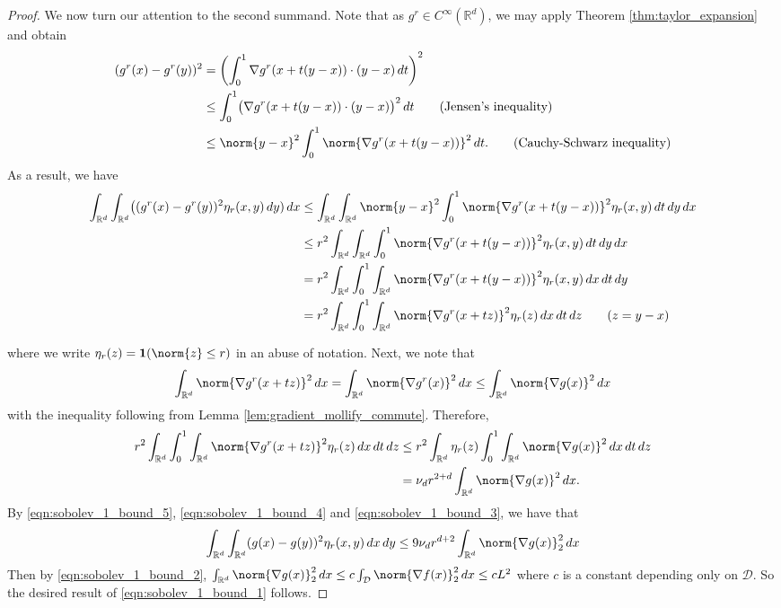 \documentclass{article}
\newcommand{\Reals}{\mathbb{R}}
\newcommand{\1}{\mathbf{1}}
\newcommand{\D}{\mathcal{D}}
\newcommand{\Rd}{\Reals^d}
\theoremstyle{alden}
\theoremstyle{aldenthm}
\theoremstyle{definition}
\theoremstyle{remark}
\begin{document}
\begin{proof}
	We now turn our attention to the second summand. Note that as $g^r \in C^{\infty}(\Rd)$, we may apply Theorem \ref{thm:taylor_expansion} and obtain
	\begin{align*}
	(g^r(x) - g^r(y))^2 & = \left(\int_{0}^{1} \nabla g^r(x + t(y - x)) \cdot (y - x) \,dt\right)^2 \\
	& \leq \int_{0}^{1} \bigl(\nabla g^r(x + t(y - x)) \cdot (y - x)\bigr)^2 \,dt  \tag{Jensen's inequality} \\
	& \leq \norm{y - x}^2 \int_{0}^{1} \norm{\nabla g^r(x + t(y - x))}^2 \,dt. \tag{Cauchy-Schwarz inequality}
	\end{align*}
	As a result, we have
	\begin{align*}
	\int_{\Rd} \int_{\Rd} \bigl((g^r(x) - g^r(y))^2 \eta_r(x,y) \,dy) \,dx & \leq \int_{\Rd} \int_{\Rd} \norm{y - x}^2  \int_{0}^{1} \norm{\nabla g^r(x + t(y - x))}^2 \eta_r(x,y) \,dt \,dy \,dx \\
	& \leq r^{2} \int_{\Rd} \int_{\Rd} \int_{0}^{1} \norm{\nabla g^r(x + t(y - x))}^2 \eta_r(x,y) \,dt \,dy \,dx \\
	& = r^{2} \int_{\Rd} \int_{0}^{1} \int_{\Rd} \norm{\nabla g^r(x + t(y - x))}^2 \eta_r(x,y) \,dx \,dt \,dy \\
	& = r^{2} \int_{\Rd} \int_{0}^{1} \int_{\Rd} \norm{\nabla g^r(x + tz)}^2 \eta_r(z) \,dx \,dt \,dz \tag{$z = y - x$}
	\end{align*}
	
	where we write $\eta_r(z) = \mathbf{1}(\norm{z} \leq r)$ in an abuse of notation. Next, we note that
	\begin{equation*}
	\int_{\Rd} \norm{\nabla g^r(x + tz)}^2 \,dx = \int_{\Rd} \norm{\nabla g^r(x)}^2 \,dx \leq \int_{\Rd} \norm{\nabla g(x)}^2 \,dx
	\end{equation*}
	with the inequality following from Lemma \ref{lem:gradient_mollify_commute}. Therefore,
	\begin{align}
	r^{2} \int_{\Rd} \int_{0}^{1} \int_{\Rd} \norm{\nabla g^r(x + tz)}^2 \eta_r(z) \,dx \,dt \,dz & \leq r^{2} \int_{\Rd} \eta_r(z) \int_{0}^{1} \int_{\Rd} \norm{\nabla g(x)}^2 \,dx  \,dt \,dz \nonumber \\
	& = \nu_d r^{2 + d} \int_{\Rd} \norm{\nabla g(x)}^2 \,dx. \label{eqn:sobolev_1_bound_3}
	\end{align}
	By \eqref{eqn:sobolev_1_bound_5}, \eqref{eqn:sobolev_1_bound_4} and \eqref{eqn:sobolev_1_bound_3}, we have that 
	\begin{equation*}
	\int_{\Rd} \int_{\Rd} (g(x) - g(y))^2 \eta_r(x,y) \,dx \,dy \leq 9 \nu_d r^{d + 2} \int_{\Rd} \norm{\nabla g(x)}_2^2 \,dx
	\end{equation*}
	Then by \eqref{eqn:sobolev_1_bound_2}, $\int_{\Rd} \norm{\nabla g(x)}_2^2 \,dx \leq c \int_{\D} \norm{\nabla f(x)}_2^2 \,dx \leq c L^2 $ where $c$ is a constant depending only on $\D$. So the desired result of \eqref{eqn:sobolev_1_bound_1} follows.
\end{proof}
\end{document}
